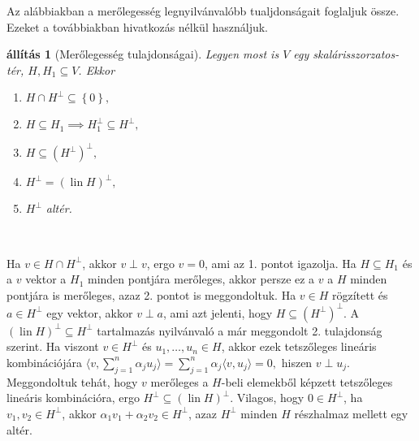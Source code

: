 \documentclass[9pt, a4paper, showtrims]{memoir}
\makeatletter
\renewenvironment{proof}[1][\proofname]
    {\par\pushQED{\qed}%
    \normalfont \topsep6\p@\@plus6\p@\relax
    \trivlist
    \item[\hskip\labelsep
        \itshape
    #1\@addpunct{:}]\ignorespaces}
    {\popQED\endtrivlist\@endpefalse}
\theoremstyle{plain}
\newtheorem{proposition}{állítás}[chapter]
\theoremstyle{remark}
\theoremstyle{definition}
\DeclareMathOperator{\lin}{lin}
\newcommand{\ip}[2]{\langle#1,#2\rangle}
\makeatother
\begin{document}
Az alábbiakban a merőlegesség legnyilvánvalóbb tualjdonságait foglaljuk össze.
Ezeket a továbbiakban hivatkozás nélkül használjuk.
\begin{proposition}[Merőlegesség tulajdonságai]
	Legyen most is $V$ egy skalárisszorzatos-tér, $H,H_1\subseteq V$.
	Ekkor
	\begin{enumerate}
		\item $H\cap H^{\perp}\subseteq\left\{ 0 \right\},$
		\item $H\subseteq H_1\implies H_1^\perp\subseteq H^\perp,$
		\item $H\subseteq \left( H^\perp \right)^\perp,$
		\item $H^{\perp}=\left( \lin H \right)^\perp,$
		\item $H^\perp$ altér.\qedhere
	\end{enumerate}
\end{proposition}\
\begin{proof}
	Ha $v\in H\cap H^\perp$, akkor $v\perp v$, ergo $v=0$, ami az 1. pontot igazolja.
	Ha $H\subseteq H_1$ és a $v$ vektor a $H_1$ minden pontjára merőleges, akkor persze ez a $v$ a $H$ minden pontjára is merőleges,
	azaz 2. pontot is meggondoltuk.
	Ha $v\in H$ rögzített és $a\in H^\perp$ egy vektor, akkor $v\perp a$, ami azt jelenti, hogy $H\subseteq \left( H^\perp \right)^\perp$.
	A $(\lin H)^\perp\subseteq H^\perp$ tartalmazás nyilvánvaló a már meggondolt 2. tulajdonság szerint.
	Ha viszont $v\in H^\perp$ és $u_1,\ldots,u_n\in H$, akkor ezek tetszőleges lineáris kombinációjára
	\begin{math}
		\ip{v}{\sum_{j=1}^n\alpha_ju_j}
		=
		\sum_{j=1}^n\alpha_j\ip{v}{u_j}
		=
		0,
	\end{math}
	hiszen $v\perp u_j$.
	Meggondoltuk tehát, hogy $v$ merőleges a $H$-beli elemekből képzett tetszőleges lineáris kombinációra,
	ergo $H^\perp\subseteq\left( \lin H \right)^\perp.$
	Vilagos, hogy $0\in H^\perp$, ha $v_1,v_2\in H^\perp$, akkor $\alpha_1v_1+\alpha_2v_2\in H^\perp$, azaz
	$H^\perp$ minden $H$ részhalmaz mellett egy altér.
\end{proof}
\end{document}
